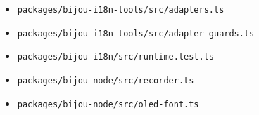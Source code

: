 \begin{itemize}
\tightlist
\item
  \texttt{p\allowbreak{}a\allowbreak{}c\allowbreak{}k\allowbreak{}a\allowbreak{}g\allowbreak{}e\allowbreak{}s\allowbreak{}/\allowbreak{}b\allowbreak{}i\allowbreak{}j\allowbreak{}o\allowbreak{}u\allowbreak{}-\allowbreak{}i\allowbreak{}1\allowbreak{}8\allowbreak{}n\allowbreak{}-\allowbreak{}t\allowbreak{}o\allowbreak{}o\allowbreak{}l\allowbreak{}s\allowbreak{}/\allowbreak{}s\allowbreak{}r\allowbreak{}c\allowbreak{}/\allowbreak{}a\allowbreak{}d\allowbreak{}a\allowbreak{}p\allowbreak{}t\allowbreak{}e\allowbreak{}r\allowbreak{}s\allowbreak{}.\allowbreak{}t\allowbreak{}s}
\item
  \texttt{p\allowbreak{}a\allowbreak{}c\allowbreak{}k\allowbreak{}a\allowbreak{}g\allowbreak{}e\allowbreak{}s\allowbreak{}/\allowbreak{}b\allowbreak{}i\allowbreak{}j\allowbreak{}o\allowbreak{}u\allowbreak{}-\allowbreak{}i\allowbreak{}1\allowbreak{}8\allowbreak{}n\allowbreak{}-\allowbreak{}t\allowbreak{}o\allowbreak{}o\allowbreak{}l\allowbreak{}s\allowbreak{}/\allowbreak{}s\allowbreak{}r\allowbreak{}c\allowbreak{}/\allowbreak{}a\allowbreak{}d\allowbreak{}a\allowbreak{}p\allowbreak{}t\allowbreak{}e\allowbreak{}r\allowbreak{}-\allowbreak{}g\allowbreak{}u\allowbreak{}a\allowbreak{}r\allowbreak{}d\allowbreak{}s\allowbreak{}.\allowbreak{}t\allowbreak{}s}
\item
  \texttt{p\allowbreak{}a\allowbreak{}c\allowbreak{}k\allowbreak{}a\allowbreak{}g\allowbreak{}e\allowbreak{}s\allowbreak{}/\allowbreak{}b\allowbreak{}i\allowbreak{}j\allowbreak{}o\allowbreak{}u\allowbreak{}-\allowbreak{}i\allowbreak{}1\allowbreak{}8\allowbreak{}n\allowbreak{}/\allowbreak{}s\allowbreak{}r\allowbreak{}c\allowbreak{}/\allowbreak{}r\allowbreak{}u\allowbreak{}n\allowbreak{}t\allowbreak{}i\allowbreak{}m\allowbreak{}e\allowbreak{}.\allowbreak{}t\allowbreak{}e\allowbreak{}s\allowbreak{}t\allowbreak{}.\allowbreak{}t\allowbreak{}s}
\item
  \texttt{p\allowbreak{}a\allowbreak{}c\allowbreak{}k\allowbreak{}a\allowbreak{}g\allowbreak{}e\allowbreak{}s\allowbreak{}/\allowbreak{}b\allowbreak{}i\allowbreak{}j\allowbreak{}o\allowbreak{}u\allowbreak{}-\allowbreak{}n\allowbreak{}o\allowbreak{}d\allowbreak{}e\allowbreak{}/\allowbreak{}s\allowbreak{}r\allowbreak{}c\allowbreak{}/\allowbreak{}r\allowbreak{}e\allowbreak{}c\allowbreak{}o\allowbreak{}r\allowbreak{}d\allowbreak{}e\allowbreak{}r\allowbreak{}.\allowbreak{}t\allowbreak{}s}
\item
  \texttt{p\allowbreak{}a\allowbreak{}c\allowbreak{}k\allowbreak{}a\allowbreak{}g\allowbreak{}e\allowbreak{}s\allowbreak{}/\allowbreak{}b\allowbreak{}i\allowbreak{}j\allowbreak{}o\allowbreak{}u\allowbreak{}-\allowbreak{}n\allowbreak{}o\allowbreak{}d\allowbreak{}e\allowbreak{}/\allowbreak{}s\allowbreak{}r\allowbreak{}c\allowbreak{}/\allowbreak{}o\allowbreak{}l\allowbreak{}e\allowbreak{}d\allowbreak{}-\allowbreak{}f\allowbreak{}o\allowbreak{}n\allowbreak{}t\allowbreak{}.\allowbreak{}t\allowbreak{}s}

\end{itemize}
